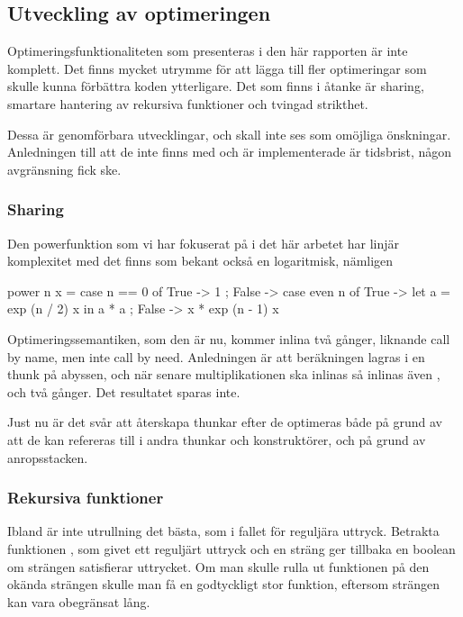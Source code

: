 \documentclass[Rapport]{subfiles}
\begin{document}
\subsection{Utveckling av optimeringen}

Optimeringsfunktionaliteten som presenteras i den här rapporten är inte
komplett. Det finns mycket utrymme för att lägga till fler optimeringar
som skulle kunna förbättra koden ytterligare. Det som finns i åtanke är
sharing, smartare hantering av rekursiva funktioner och tvingad strikthet.

Dessa är genomförbara utvecklingar, och skall inte ses som omöjliga önskningar.
Anledningen till att de inte finns med och är implementerade är tidsbrist,
någon avgränsning fick ske.

\subsubsection{Sharing}
Den powerfunktion som vi har fokuserat på i det här arbetet har linjär
komplexitet med det finns som bekant också en logaritmisk, nämligen

\begin{codeEx}
power n x = case n == 0 of
    { True  -> 1
    ; False -> case even n of
        { True  -> let a = exp (n / 2) x 
                   in  a * a
        ; False -> x * exp (n - 1) x
        }
    }
\end{codeEx}

Optimeringssemantiken, som den är nu, kommer inlina  två gånger,
liknande call by name, men inte call by need. Anledningen är att beräkningen
 lagras i en thunk på abyssen, och när senare multiplikationen ska
inlinas så inlinas även , och två gånger. Det resultatet sparas
inte.

    Just nu är det svår att återskapa thunkar efter de optimeras både på grund
av att de kan refereras till i andra thunkar och konstruktörer, och på grund
av anropsstacken. 

\subsubsection{Rekursiva funktioner}


Ibland är inte utrullning det bästa, som i fallet för reguljära uttryck.
Betrakta funktionen , som givet
ett reguljärt uttryck och en sträng ger tillbaka en boolean om strängen
satisfierar uttrycket. Om man skulle rulla ut funktionen på den okända strängen
skulle man få en godtyckligt stor funktion, eftersom strängen kan vara 
obegränsat lång.
\end{document}
